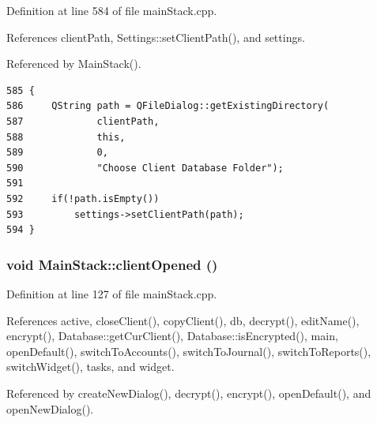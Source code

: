 Definition at line 584 of file main\-Stack.cpp.

References client\-Path, Settings::set\-Client\-Path(), and settings.

Referenced by Main\-Stack().

\footnotesize\begin{verbatim}585 {
586     QString path = QFileDialog::getExistingDirectory(
587             clientPath,
588             this,
589             0,
590             "Choose Client Database Folder");
591 
592     if(!path.isEmpty())
593         settings->setClientPath(path);
594 }
\end{verbatim}\normalsize 


\hypertarget{classMainStack_d0}{
\subsubsection[clientOpened]{\setlength{\rightskip}{0pt plus 5cm}void Main\-Stack::client\-Opened ()}}
\label{classMainStack_d0}


Definition at line 127 of file main\-Stack.cpp.

References active, close\-Client(), copy\-Client(), db, decrypt(), edit\-Name(), encrypt(), Database::get\-Cur\-Client(), Database::is\-Encrypted(), main, open\-Default(), switch\-To\-Accounts(), switch\-To\-Journal(), switch\-To\-Reports(), switch\-Widget(), tasks, and widget.

Referenced by create\-New\-Dialog(), decrypt(), encrypt(), open\-Default(), and open\-New\-Dialog().

